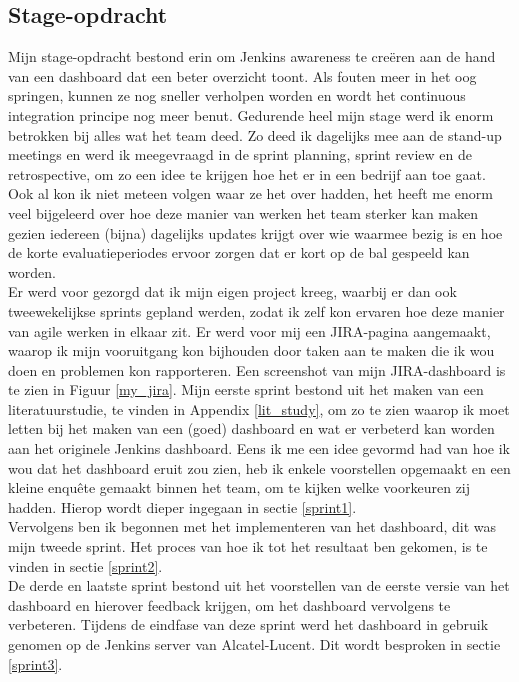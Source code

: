 \documentclass[10pt,a4paper]{article}
\begin{document}
\subsection{Stage-opdracht}
\label{opdracht}
Mijn stage-opdracht bestond erin om Jenkins awareness te cre\"eren aan de hand van een dashboard dat een beter overzicht toont.
Als fouten meer in het oog springen, kunnen ze nog sneller verholpen worden en wordt het continuous integration principe nog meer benut.  Gedurende heel mijn stage werd ik enorm betrokken bij alles wat het team deed. Zo deed ik dagelijks mee aan de stand-up meetings en werd ik meegevraagd in de sprint planning, sprint review en de retrospective, om zo een idee te krijgen hoe het er in een bedrijf aan toe gaat. Ook al kon ik niet meteen volgen waar ze het over hadden, het heeft me enorm veel bijgeleerd over hoe deze manier van werken het team sterker kan maken gezien iedereen (bijna) dagelijks updates krijgt over wie waarmee bezig is en hoe de korte evaluatieperiodes ervoor zorgen dat er kort op de bal gespeeld kan worden.\\
Er werd voor gezorgd dat ik mijn eigen project kreeg, waarbij er dan ook tweewekelijkse sprints gepland werden, zodat ik zelf kon ervaren hoe deze manier van agile werken in elkaar zit. Er werd voor mij een JIRA-pagina aangemaakt, waarop ik mijn vooruitgang kon bijhouden door taken aan te maken die ik wou doen en problemen kon rapporteren. Een screenshot van mijn JIRA-dashboard is te zien in Figuur \ref{my_jira}.
Mijn eerste sprint bestond uit het maken van een literatuurstudie, te vinden in Appendix \ref{lit_study}, om zo te zien waarop ik moet letten bij het maken van een (goed) dashboard en wat er verbeterd kan worden aan het originele Jenkins dashboard. Eens ik me een idee gevormd had van hoe ik wou dat het dashboard eruit zou zien, heb ik enkele voorstellen opgemaakt en een kleine enqu\^ete gemaakt binnen het team, om te kijken welke voorkeuren zij hadden. Hierop wordt dieper ingegaan in sectie \ref{sprint1}.\\
Vervolgens ben ik begonnen met het implementeren van het dashboard, dit was mijn tweede sprint. Het proces van hoe ik tot het resultaat ben gekomen, is te vinden in sectie \ref{sprint2}.\\
De derde en laatste sprint bestond uit het voorstellen van de eerste versie van het dashboard en hierover feedback krijgen, om het dashboard vervolgens te verbeteren. Tijdens de eindfase van deze sprint werd het dashboard in gebruik genomen op de Jenkins server van Alcatel-Lucent. Dit wordt besproken in sectie \ref{sprint3}.
\end{document}
